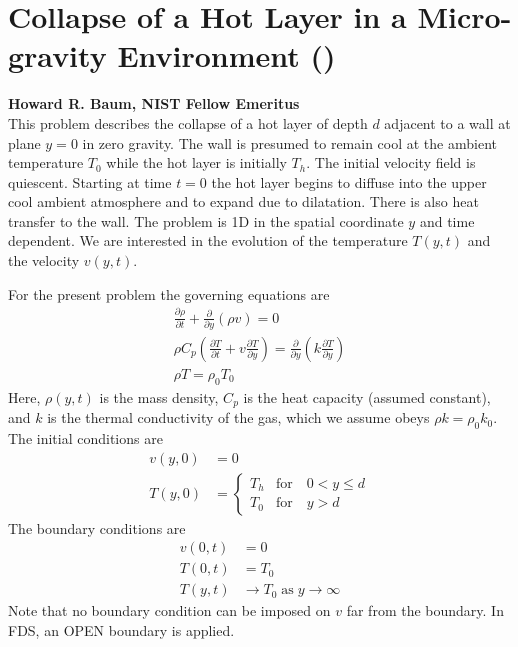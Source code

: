 \documentclass[11pt]{book}
\begin{document}
\clearpage

\section{Collapse of a Hot Layer in a Micro-gravity Environment (\texorpdfstring{}{hot\_layer\_360})}
\label{sec:baum_hot_layer}

\textbf{Howard R. Baum, NIST Fellow Emeritus}\\

\noindent This problem describes the collapse of a hot layer of depth $d$ adjacent to a wall at plane $y=0$ in zero gravity.  The wall is presumed to remain cool at the ambient temperature $T_0$ while the hot layer is initially $T_h$.  The initial velocity field is quiescent.  Starting at time $t=0$ the hot layer begins to diffuse into the upper cool ambient atmosphere and to expand due to dilatation.  There is also heat transfer to the wall.  The problem is 1D in the spatial coordinate $y$ and time dependent.  We are interested in the evolution of the temperature $T(y,t)$ and the velocity $v(y,t)$.

For the present problem the governing equations are
\begin{gather}
\frac{\partial \rho}{\partial t} + \frac{\partial}{\partial y}(\rho v) = 0 \\
\rho C_p \left( \frac{\partial T}{\partial t} + v \frac{\partial T}{\partial y} \right) = \frac{\partial}{\partial y} \left( k \frac{\partial T}{\partial y} \right) \\
\rho T = \rho_0 T_0
\end{gather}
Here, $\rho(y,t)$ is the mass density, $C_p$ is the heat capacity (assumed constant), and $k$ is the thermal conductivity of the gas, which we assume obeys $\rho k = \rho_0 k_0$. The initial conditions are
\begin{align}
v(y,0) &= 0 \\
T(y,0) &= \left\{ \begin{array}{ll} T_h & \mbox{for} \quad 0 < y \le d \\ T_0 & \mbox{for} \quad y > d \end{array} \right.
\end{align}
The boundary conditions are
\begin{align}
v(0,t) &= 0 \\
T(0,t) &= T_0 \\
T(y,t) &\rightarrow T_0 \;\mbox{as}\; y\rightarrow\infty
\end{align}
Note that no boundary condition can be imposed on $v$ far from the boundary.  In FDS, an {\ct OPEN} boundary is applied.
\end{document}
